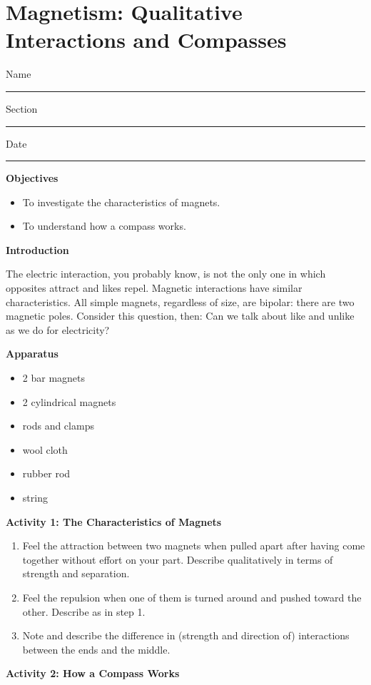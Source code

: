 
\section{Magnetism: Qualitative Interactions and Compasses}

Name \rule{2.0in}{0.1pt}\hfill{}Section \rule{1.0in}{0.1pt}\hfill{}Date
\rule{1.0in}{0.1pt}

\textbf{Objectives}

\begin{itemize}
\item To investigate the characteristics of magnets.
\item To understand how a compass works.
\end{itemize}
\textbf{Introduction} 

The electric interaction, you probably know, is not the only one in
which opposites attract and likes repel. Magnetic interactions have
similar characteristics. All simple magnets, regardless of size, are
bipolar: there are two magnetic poles. Consider this question, then:
Can we talk about like and unlike as we do for electricity?

\textbf{Apparatus}

\begin{itemize}
\item 2 bar magnets 
\item 2 cylindrical magnets 
\item rods and clamps
\item wool cloth
\item rubber rod
\item string
\end{itemize}
\textbf{Activity 1: The Characteristics of Magnets}

\begin{enumerate}
\item Feel the attraction between two magnets when pulled apart after having
come together without effort on your part. Describe qualitatively
in terms of strength and separation.\vspace{15mm}

\item Feel the repulsion when one of them is turned around and pushed toward
the other. Describe as in step 1.\vspace{15mm}

\item Note and describe the difference in (strength and direction of) interactions
between the ends and the middle.\vspace{15mm}

\end{enumerate}
\textbf{Activity 2: How a Compass Works}

